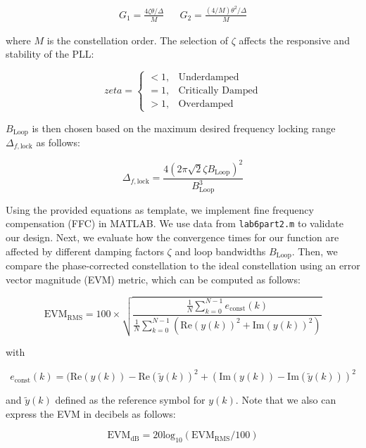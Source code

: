 \documentclass{article}
\begin{document}
\begin{align}
	G_1 = \frac{4\zeta\theta/\Delta}{M} && G_2 = \frac{(4/M)\theta^2/\Delta}{M}
\end{align}

\noindent where $M$ is the constellation order. The selection of $\zeta$ affects the responsive and stability of the PLL:

\begin{equation}
zeta = \begin{cases}
< 1, & \text{Underdamped}\\
= 1, & \text{Critically Damped}\\
> 1, & \text{Overdamped}
\end{cases}
\end{equation}

\noindent $B_\text{Loop}$ is then chosen based on the maximum desired frequency locking range $\Delta_{f,\text{lock}}$ as follows:

\begin{equation}
	\Delta_{f,\text{lock}} = \frac{4(2\pi\sqrt{2}\zeta{B_\text{Loop}})^2}{B_\text{Loop}^3}
\end{equation}

Using the provided equations as template, we implement fine frequency compensation (FFC) in MATLAB. We use data from \texttt{lab6part2.m} to validate our design. Next, we evaluate how the convergence times for our function are affected by different damping factors $\zeta$ and loop bandwidths $B_\text{Loop}$. Then, we compare the phase-corrected constellation to the ideal constellation using an error vector magnitude (EVM) metric, which can be computed as follows:

\begin{equation}
	\text{EVM}_\text{RMS} = 100 \times \sqrt{\frac{\frac{1}{N}\sum_{k=0}^{N-1}{e_\text{const}(k)}}{\frac{1}{N}\sum_{k=0}^{N-1}{(\text{Re}(y(k))^2 + \text{Im}(y(k))^2)}}}
\end{equation}

\noindent with

\begin{equation}
	e_\text{const}(k) = (\text{Re}(y(k)) - \text{Re}(\tilde{y}(k))^2 + (\text{Im}(y(k)) - \text{Im}(\tilde{y}(k)))^2
\end{equation}

\noindent and $\tilde{y}(k)$ defined as the reference symbol for $y(k)$. Note that we also can express the EVM in decibels as follows:

\begin{equation}
	\text{EVM}_\text{dB} = 20\text{log}_{10}(\text{EVM}_\text{RMS}/100)
\end{equation}
\end{document}
